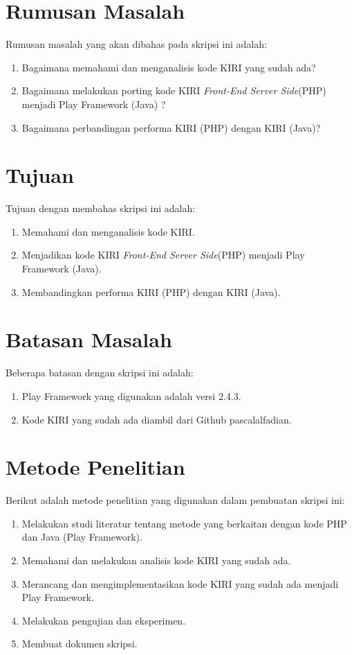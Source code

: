 \section{Rumusan Masalah}
\label{rumusanMasalah}
Rumusan masalah yang akan dibahas pada skripsi ini adalah:
\begin{enumerate}
	\item Bagaimana memahami dan menganalisis kode KIRI yang sudah ada?
	\item Bagaimana melakukan porting kode KIRI \textit{Front-End Server Side}(PHP) menjadi Play Framework (Java) ?
	\item Bagaimana perbandingan performa KIRI (PHP) dengan KIRI (Java)?
\end{enumerate}

\section{Tujuan}
\label{sec:tujuan}
Tujuan dengan membahas skripsi ini adalah:
\begin{enumerate}
	\item Memahami dan menganalisis kode KIRI.
	\item Menjadikan kode KIRI \textit{Front-End Server Side}(PHP) menjadi Play Framework (Java).
	\item Membandingkan performa KIRI (PHP) dengan KIRI (Java).
\end{enumerate}

\section{Batasan Masalah}
\label{sec:batasanMasalah}
Beberapa batasan dengan skripsi ini adalah:
\begin{enumerate}
	\item Play Framework yang digunakan adalah versi 2.4.3.
	\item Kode KIRI yang sudah ada diambil dari Github pascalalfadian\cite{githubkiri}.
\end{enumerate}

\section{Metode Penelitian}
\label{sec:metodePenelitian}
Berikut adalah metode penelitian yang digunakan dalam pembuatan skripsi ini:
	\begin{enumerate}
		\item Melakukan studi literatur tentang metode yang berkaitan dengan kode PHP dan Java (Play Framework).
		\item Memahami dan melakukan analisis kode KIRI yang sudah ada.
		\item Merancang dan mengimplementasikan kode KIRI yang sudah ada menjadi Play Framework.
		\item Melakukan pengujian dan eksperimen.
		\item Membuat dokumen skripsi.
	\end{enumerate}
	
